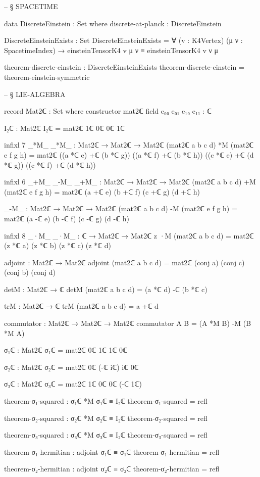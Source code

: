 \documentclass[11pt,a4paper]{book}
\begin{document}
\begin{code}
-- § SPACETIME

data DiscreteEinstein : Set where
  discrete-at-planck : DiscreteEinstein

DiscreteEinsteinExists : Set
DiscreteEinsteinExists = ∀ (v : K4Vertex) (μ ν : SpacetimeIndex) → 
  einsteinTensorK4 v μ ν ≡ einsteinTensorK4 v ν μ

theorem-discrete-einstein : DiscreteEinsteinExists
theorem-discrete-einstein = theorem-einstein-symmetric


-- § LIE-ALGEBRA

record Mat2ℂ : Set where
  constructor mat2ℂ
  field
    e₀₀ e₀₁ e₁₀ e₁₁ : ℂ

I₂ℂ : Mat2ℂ
I₂ℂ = mat2ℂ 1ℂ 0ℂ 0ℂ 1ℂ

infixl 7 _*M_
_*M_ : Mat2ℂ → Mat2ℂ → Mat2ℂ
(mat2ℂ a b c d) *M (mat2ℂ e f g h) =
  mat2ℂ ((a *ℂ e) +ℂ (b *ℂ g)) ((a *ℂ f) +ℂ (b *ℂ h))
         ((c *ℂ e) +ℂ (d *ℂ g)) ((c *ℂ f) +ℂ (d *ℂ h))

infixl 6 _+M_ _-M_
_+M_ : Mat2ℂ → Mat2ℂ → Mat2ℂ
(mat2ℂ a b c d) +M (mat2ℂ e f g h) =
  mat2ℂ (a +ℂ e) (b +ℂ f) (c +ℂ g) (d +ℂ h)

_-M_ : Mat2ℂ → Mat2ℂ → Mat2ℂ
(mat2ℂ a b c d) -M (mat2ℂ e f g h) =
  mat2ℂ (a -ℂ e) (b -ℂ f) (c -ℂ g) (d -ℂ h)

infixl 8 _·M_
_·M_ : ℂ → Mat2ℂ → Mat2ℂ
z ·M (mat2ℂ a b c d) = mat2ℂ (z *ℂ a) (z *ℂ b) (z *ℂ c) (z *ℂ d)

adjoint : Mat2ℂ → Mat2ℂ
adjoint (mat2ℂ a b c d) = mat2ℂ (conj a) (conj c) (conj b) (conj d)

detM : Mat2ℂ → ℂ
detM (mat2ℂ a b c d) = (a *ℂ d) -ℂ (b *ℂ c)

trM : Mat2ℂ → ℂ
trM (mat2ℂ a b c d) = a +ℂ d

commutator : Mat2ℂ → Mat2ℂ → Mat2ℂ
commutator A B = (A *M B) -M (B *M A)

σ₁ℂ : Mat2ℂ
σ₁ℂ = mat2ℂ 0ℂ 1ℂ 1ℂ 0ℂ

σ₂ℂ : Mat2ℂ
σ₂ℂ = mat2ℂ 0ℂ (-ℂ iℂ) iℂ 0ℂ

σ₃ℂ : Mat2ℂ
σ₃ℂ = mat2ℂ 1ℂ 0ℂ 0ℂ (-ℂ 1ℂ)

theorem-σ₁-squared : σ₁ℂ *M σ₁ℂ ≡ I₂ℂ
theorem-σ₁-squared = refl

theorem-σ₂-squared : σ₂ℂ *M σ₂ℂ ≡ I₂ℂ
theorem-σ₂-squared = refl

theorem-σ₃-squared : σ₃ℂ *M σ₃ℂ ≡ I₂ℂ
theorem-σ₃-squared = refl

theorem-σ₁-hermitian : adjoint σ₁ℂ ≡ σ₁ℂ
theorem-σ₁-hermitian = refl

theorem-σ₂-hermitian : adjoint σ₂ℂ ≡ σ₂ℂ
theorem-σ₂-hermitian = refl


\end{code}
\end{document}
